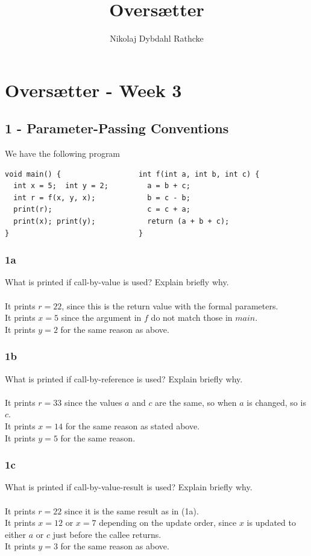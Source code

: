 \documentclass[12pt]{article}
\title{Oversætter}
\author{Nikolaj Dybdahl Rathcke}
\begin{document}
\section*{Oversætter - Week 3}

\subsection*{1 - Parameter-Passing Conventions}
We have the following program
\begin{verbatim}
void main() {                  int f(int a, int b, int c) {
  int x = 5;  int y = 2;         a = b + c;
  int r = f(x, y, x);            b = c - b;
  print(r);                      c = c + a;
  print(x); print(y);            return (a + b + c);
}                              }
\end{verbatim}

\subsubsection*{1a}
What is printed if call-by-value is used? Explain briefly why.\\
\\
It prints $r=22$, since this is the return value with the formal parameters.\\
It prints $x=5$ since the argument in $f$ do not match those in $main$.\\
It prints $y=2$ for the same reason as above.

\subsubsection*{1b}
What is printed if call-by-reference is used? Explain briefly why.\\
\\
It prints $r=33$ since the values $a$ and $c$ are the same, so when $a$ is changed, so is $c$.\\
It prints $x=14$ for the same reason as stated above.\\
It prints $y=5$ for the same reason.

\subsubsection*{1c}
What is printed if call-by-value-result is used? Explain briefly why.\\
\\
It prints $r=22$ since it is the same result as in (1a).\\
It prints $x=12$ or $x=7$ depending on the update order, since $x$ is updated to either $a$ or $c$ just before the callee returns.\\
It prints $y=3$ for the same reason as above.
\end{document}
